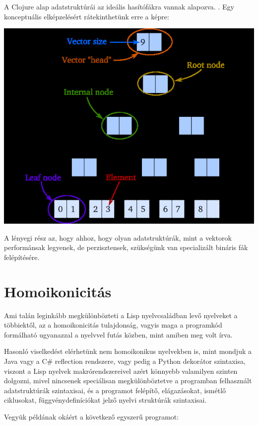 \documentclass[final, 12pt] {ubb_dolgozat}{book}
\begin{document}
A Clojure alap adatstruktúrái az ideális hasítófákra vannak alapozva. \citep{jayasingheExtremeAmplitudeMassive2019} \citep{bagwellIdealHashTrees2001}. Egy konceptuális elképzelésért
rátekinthetünk erre a képre:

\begin{center}
\includegraphics[width=.9\linewidth]{images/perzisztens-vektor.jpg}
\end{center}

A lényegi rész az, hogy ahhoz, hogy olyan adatstruktúrák, mint a vektorok performánsak legyenek, de perzisztensek, szükségünk van
specializált bináris fák felépítésére.

\section{Homoikonicitás}
\label{sec:orgac78198}
Ami talán leginkább megkülönbözteti a Lisp nyelvcsaládban levő nyelveket a többiektől, az a  homoikonicitás \citep{mcilroyMacroInstructionExtensions1960} tulajdonság, vagyis maga a programkód
formálható ugyanazzal a nyelvvel futás közben, mint amiben meg volt írva.

Hasonló viselkedést elérhetünk nem homoikonikus nyelvekben is, mint mondjuk a Java vagy a C\# reflection rendszere, vagy
pedig a Python dekorátor szintaxisa, viszont a Lisp nyelvek makrórendszereivel azért könnyebb valamilyen szinten dolgozni, mivel nincsenek speciálisan megkülönböztetve a programban
felhasznált adatstruktúrák szintaxisai, és a programot felépítő, elágazásokat, ismétlő ciklusokat, függvénydefiníciókat jelző nyelvi struktúrák szintaxisai.

Vegyük példának okáért a következő egyszerű programot:
\end{document}
